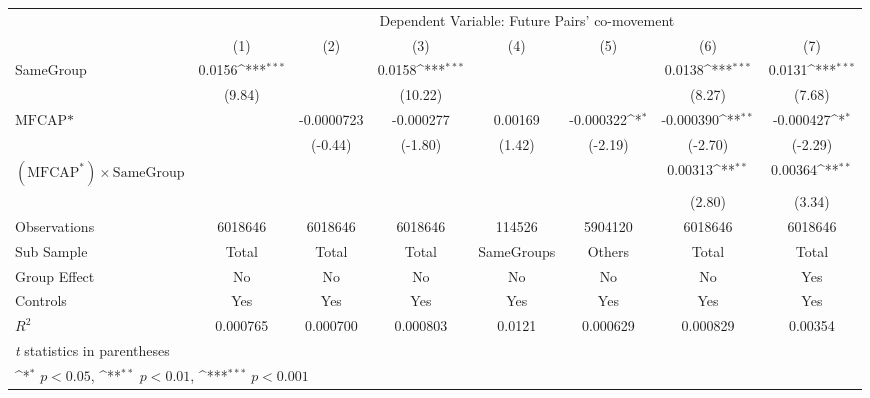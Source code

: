{
\def\sym#1{\ifmmode^{#1}\else\(^{#1}\)\fi}
\begin{tabular}{l*{7}{c}}
\hline\hline
                &\multicolumn{7}{c}{Dependent Variable: Future Pairs' co-movement}                                                                   \\\cmidrule(lr){2-8}
                &\multicolumn{1}{c}{(1)}         &\multicolumn{1}{c}{(2)}         &\multicolumn{1}{c}{(3)}         &\multicolumn{1}{c}{(4)}         &\multicolumn{1}{c}{(5)}         &\multicolumn{1}{c}{(6)}         &\multicolumn{1}{c}{(7)}         \\
\hline
SameGroup       &   0.0156\sym{***}&                  &   0.0158\sym{***}&                  &                  &   0.0138\sym{***}&   0.0131\sym{***}\\
                &   (9.84)         &                  &  (10.22)         &                  &                  &   (8.27)         &   (7.68)         \\
[1em]
$ \text{MFCAP*} $&                  &-0.0000723         &-0.000277         &  0.00169         &-0.000322\sym{*}  &-0.000390\sym{**} &-0.000427\sym{*}  \\
                &                  &  (-0.44)         &  (-1.80)         &   (1.42)         &  (-2.19)         &  (-2.70)         &  (-2.29)         \\
[1em]
 $ (\text{MFCAP}^*) \times {\text{SameGroup} }  $ &                  &                  &                  &                  &                  &  0.00313\sym{**} &  0.00364\sym{**} \\
                &                  &                  &                  &                  &                  &   (2.80)         &   (3.34)         \\
\hline
Observations    &  6018646         &  6018646         &  6018646         &   114526         &  5904120         &  6018646         &  6018646         \\
Sub Sample      &    Total         &    Total         &    Total         &SameGroups         &   Others         &    Total         &    Total         \\
Group Effect    &       No         &       No         &       No         &       No         &       No         &       No         &      Yes         \\
Controls        &      Yes         &      Yes         &      Yes         &      Yes         &      Yes         &      Yes         &      Yes         \\
$ R^2 $         & 0.000765         & 0.000700         & 0.000803         &   0.0121         & 0.000629         & 0.000829         &  0.00354         \\
\hline\hline
\multicolumn{8}{l}{\footnotesize \textit{t} statistics in parentheses}\\
\multicolumn{8}{l}{\footnotesize \sym{*} \(p<0.05\), \sym{**} \(p<0.01\), \sym{***} \(p<0.001\)}\\
\end{tabular}
}
